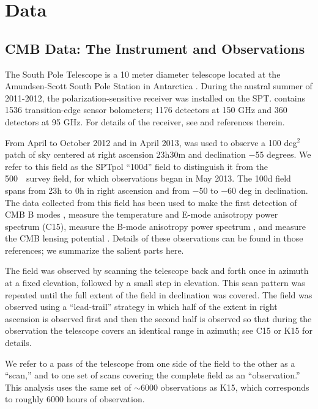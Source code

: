 \section{Data}
\label{sec:data}
\subsection{CMB Data: The \sptpol Instrument and Observations}
\label{sec:instrument}
The South Pole Telescope is a 10 meter diameter telescope located at the Amundsen-Scott South Pole Station in Antarctica \citep{carlstrom11, padin08}.
During the austral summer of 2011-2012, the polarization-sensitive \sptpol receiver was installed on the SPT.
\sptpol contains 1536 transition-edge sensor bolometers; 1176 detectors at 150 GHz and 360 detectors at 95 GHz.
For details of the receiver, see \cite[hereafter C15]{crites14} and references therein.

From April to October 2012 and in April 2013, \sptpol was used to observe a 100 deg$^2$ patch of sky centered at right ascension 23h30m and declination $-$55 degrees.
We refer to this field as the SPTpol ``100d'' field to distinguish it from the 500~\sqdeg\ survey field,
for which observations began in May 2013.
The 100d field spans from 23h to 0h in right ascension and from $-$50 to $-$60 deg in declination.
The data collected from this field has been used to make the first detection of CMB B modes \citep[][hereafter H13]{hanson13},
measure the temperature and E-mode anisotropy power spectrum (C15),
measure the B-mode anisotropy power spectrum \citep[][hereafter K15]{keisler15},
and measure the CMB lensing potential \citep[][hereafter S15]{story14}.
Details of these observations can be found in those references; we summarize the salient parts here.

The field was observed by scanning the telescope back and forth once in azimuth at a fixed elevation, followed by a small step in elevation.
This scan pattern was repeated until the full extent of the field in declination was covered.
The field was observed using a ``lead-trail'' strategy in which half of the extent in right ascension is observed first and then the second half is observed so that during the observation the telescope covers an identical range in azimuth; see C15 or K15 for details.

We refer to a pass of the telescope from one side of the field to the other as a ``scan,'' and to one set of scans covering the complete field as an ``observation.''
This analysis uses the same set of $\sim 6000$ observations as K15, which corresponds to roughly 6000 hours of observation.

